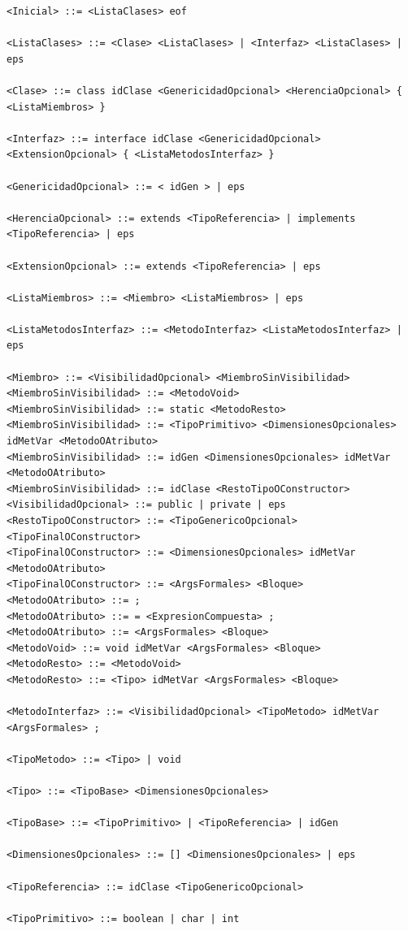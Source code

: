 \documentclass[11pt,a4paper]{article}
\begin{document}
{\footnotesize
\begin{verbatim}
<Inicial> ::= <ListaClases> eof

<ListaClases> ::= <Clase> <ListaClases> | <Interfaz> <ListaClases> | eps

<Clase> ::= class idClase <GenericidadOpcional> <HerenciaOpcional> { <ListaMiembros> }

<Interfaz> ::= interface idClase <GenericidadOpcional> <ExtensionOpcional> { <ListaMetodosInterfaz> }

<GenericidadOpcional> ::= < idGen > | eps

<HerenciaOpcional> ::= extends <TipoReferencia> | implements <TipoReferencia> | eps

<ExtensionOpcional> ::= extends <TipoReferencia> | eps

<ListaMiembros> ::= <Miembro> <ListaMiembros> | eps

<ListaMetodosInterfaz> ::= <MetodoInterfaz> <ListaMetodosInterfaz> | eps

<Miembro> ::= <VisibilidadOpcional> <MiembroSinVisibilidad>
<MiembroSinVisibilidad> ::= <MetodoVoid>
<MiembroSinVisibilidad> ::= static <MetodoResto>
<MiembroSinVisibilidad> ::= <TipoPrimitivo> <DimensionesOpcionales> idMetVar <MetodoOAtributo>
<MiembroSinVisibilidad> ::= idGen <DimensionesOpcionales> idMetVar <MetodoOAtributo>
<MiembroSinVisibilidad> ::= idClase <RestoTipoOConstructor>
<VisibilidadOpcional> ::= public | private | eps
<RestoTipoOConstructor> ::= <TipoGenericoOpcional> <TipoFinalOConstructor>
<TipoFinalOConstructor> ::= <DimensionesOpcionales> idMetVar <MetodoOAtributo>
<TipoFinalOConstructor> ::= <ArgsFormales> <Bloque>
<MetodoOAtributo> ::= ;
<MetodoOAtributo> ::= = <ExpresionCompuesta> ;
<MetodoOAtributo> ::= <ArgsFormales> <Bloque>
<MetodoVoid> ::= void idMetVar <ArgsFormales> <Bloque>
<MetodoResto> ::= <MetodoVoid>
<MetodoResto> ::= <Tipo> idMetVar <ArgsFormales> <Bloque>

<MetodoInterfaz> ::= <VisibilidadOpcional> <TipoMetodo> idMetVar <ArgsFormales> ;

<TipoMetodo> ::= <Tipo> | void

<Tipo> ::= <TipoBase> <DimensionesOpcionales>

<TipoBase> ::= <TipoPrimitivo> | <TipoReferencia> | idGen

<DimensionesOpcionales> ::= [] <DimensionesOpcionales> | eps

<TipoReferencia> ::= idClase <TipoGenericoOpcional>

<TipoPrimitivo> ::= boolean | char | int


\end{verbatim}}
\end{document}
